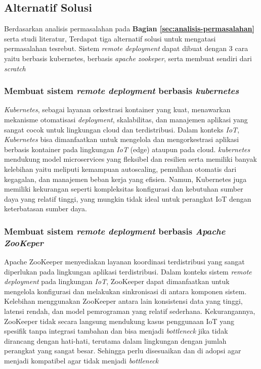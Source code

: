 \subsection{Alternatif Solusi}
\label{sec:analisis-solusi}

Berdasarkan analisis permasalahan pada \textbf{Bagian \ref{sec:analisis-permasalahan}} serta studi literatur, Terdapat tiga alternatif solusi untuk mengatasi permasalahan tesrebut. Sistem \textit{remote deployment} dapat dibuat dengan 3 cara yaitu berbasis kubernetes, berbasis \textit{apache zookeper}, serta membuat sendiri dari \textit{scratch}

\subsubsection{Membuat sistem \textit{remote deployment} berbasis \textit{kubernetes}}
\textit{Kubernetes}, sebagai layanan orkestrasi kontainer yang kuat, menawarkan mekanisme otomatisasi \textit{deployment}, skalabilitas, dan manajemen aplikasi yang sangat cocok untuk lingkungan cloud dan terdistribusi. Dalam konteks \textit{IoT}, \textit{Kubernetes} bisa dimanfaatkan untuk mengelola dan mengorkestrasi aplikasi berbasis kontainer pada lingkungan \textit{IoT} (edge) ataupun pada cloud. \textit{kubernetes} mendukung model microservices yang fleksibel dan resilien serta memiliki banyak kelebihan yaitu  meliputi kemampuan autoscaling, pemulihan otomatis dari kegagalan, dan manajemen beban kerja yang efisien. Namun, Kubernetes juga memiliki kekurangan seperti kompleksitas konfigurasi dan kebutuhan sumber daya yang relatif tinggi, yang mungkin tidak ideal untuk perangkat IoT dengan keterbatasan sumber daya.

\subsubsection{Membuat sistem \textit{remote deployment} berbasis \textit{Apache ZooKeper}}
Apache ZooKeeper menyediakan layanan koordinasi terdistribusi yang sangat diperlukan pada lingkungan aplikasi terdistribusi. Dalam konteks sistem \textit{remote deployment} pada lingkungan \textit{IoT}, ZooKeeper dapat dimanfaatkan untuk mengelola konfigurasi dan melakukan sinkronisasi di antara komponen sistem. Kelebihan menggunakan ZooKeeper antara lain konsistensi data yang tinggi, latensi rendah, dan model pemrograman yang relatif sederhana. Kekurangannya, ZooKeeper tidak secara langsung mendukung kasus penggunaan IoT yang spesifik tanpa integrasi tambahan dan bisa menjadi \textit{bottleneck} jika tidak dirancang dengan hati-hati, terutama dalam lingkungan dengan jumlah perangkat yang sangat besar. Sehingga perlu disesuaikan dan di adopsi agar menjadi kompatibel agar tidak menjadi \textit{bottleneck}

